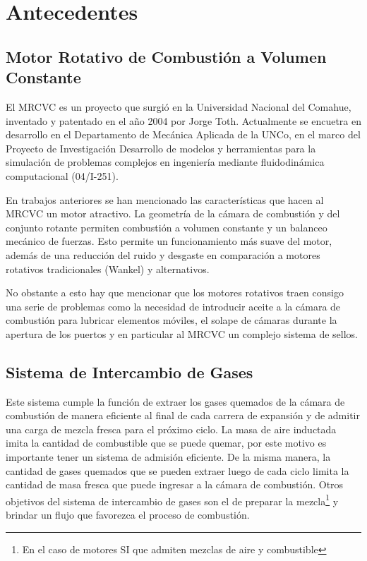 \chapter{Antecedentes} \label{cap:antecedentes}

\section{Motor Rotativo de Combustión a Volumen Constante}
%
El MRCVC es un proyecto que surgió en la Universidad Nacional del
Comahue, inventado y patentado en el año 2004 por Jorge Toth\cite{toth}.
%
Actualmente se encuetra en desarrollo en el Departamento de Mecánica Aplicada
de la UNCo, en el marco del Proyecto de Investigación Desarrollo de modelos y
herramientas para la simulación de problemas complejos en ingeniería mediante
fluidodinámica computacional (04/I-251).

En trabajos anteriores\cite{lopez16, lopez13, roldan} se han mencionado las
características que hacen al MRCVC un motor atractivo. La geometría de la cámara
de combustión y del conjunto rotante permiten  combustión a volumen constante y
un balanceo mecánico de fuerzas.
%
Esto permite un funcionamiento más suave del motor, además de una reducción del
ruido y desgaste en comparación a motores rotativos tradicionales (Wankel) y
alternativos.


No obstante a esto hay que mencionar que los motores rotativos traen consigo una
serie de problemas como la necesidad de introducir aceite a la cámara de
combustión para lubricar elementos móviles, el solape de cámaras durante la
apertura de los puertos y en particular al MRCVC un complejo sistema de
sellos\cite{roldan}.



\section{Sistema de Intercambio de Gases}
%
Este sistema cumple la función de extraer los gases quemados de la cámara de
combustión de manera eficiente al final de cada carrera de expansión y de
admitir una carga de mezcla fresca para el próximo ciclo.
%
%
La masa de aire inductada imita la cantidad de combustible que se puede quemar,
por este motivo es importante tener un sistema de admisión eficiente.
%
De la misma manera, la cantidad de gases quemados que se pueden extraer luego de
cada ciclo limita la cantidad de masa fresca que puede ingresar a la cámara de
combustión.
%
Otros objetivos del sistema de intercambio de gases son el de preparar la
mezcla\footnote{En el caso de motores SI que admiten mezclas de aire y
combustible} y brindar un flujo que favorezca el proceso de combustión.

